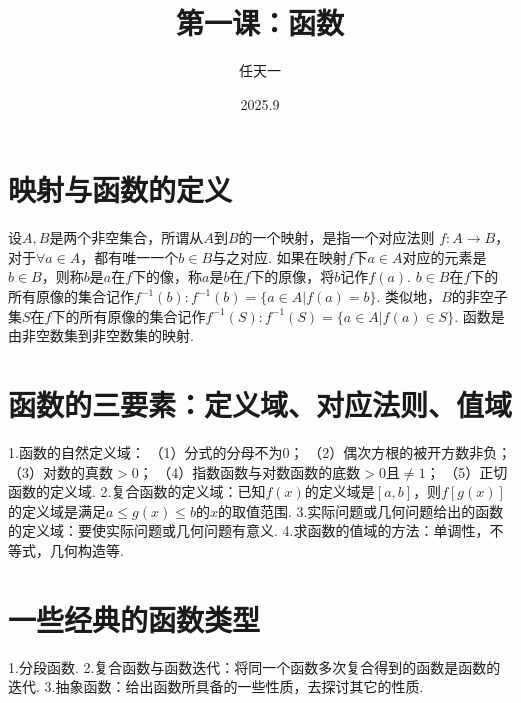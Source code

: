 \documentclass{article}
\title{第一课：函数}
\author{任天一 }
\date{2025.9}
\begin{document}
\maketitle

\section{映射与函数的定义}
设$A,B$是两个非空集合，所谓从$A$到$B$的一个映射，是指一个对应法则 $f:A \rightarrow B$，对于$\forall a \in A$，都有唯一一个$b \in B$与之对应. \newline
\newline
如果在映射$f$下$a \in A$对应的元素是$b \in B$，则称$b$是$a$在$f$下的像，称$a$是$b$在$f$下的原像，将$b$记作$f(a)$.\newline
\newline
$b \in B$在$f$下的所有原像的集合记作$f^{-1}(b):f^{-1}(b) = \{a \in A|f(a) = b\}$.\newline
类似地，$B$的非空子集$S$在$f$下的所有原像的集合记作$f^{-1}(S):f^{-1}(S) = \{a \in A|f(a) \in S\}$.\newline
\newline
函数是由非空数集到非空数集的映射.

\section{函数的三要素：定义域、对应法则、值域}
1.函数的自然定义域：\newline
（1）分式的分母不为0；\newline
（2）偶次方根的被开方数非负；\newline
（3）对数的真数$>0$；\newline
（4）指数函数与对数函数的底数$>0$且$\ne 1$；\newline
（5）正切函数的定义域.\newline
2.复合函数的定义域：已知$f(x)$的定义域是$[a,b]$，则$f[g(x)]$的定义域是满足$a \leq g(x) \leq b$的$x$的取值范围.\newline
3.实际问题或几何问题给出的函数的定义域：要使实际问题或几何问题有意义.\newline
4.求函数的值域的方法：单调性，不等式，几何构造等.

\section{一些经典的函数类型}
1.分段函数.\newline
2.复合函数与函数迭代：将同一个函数多次复合得到的函数是函数的迭代.\newline
3.抽象函数：给出函数所具备的一些性质，去探讨其它的性质.
\end{document}

